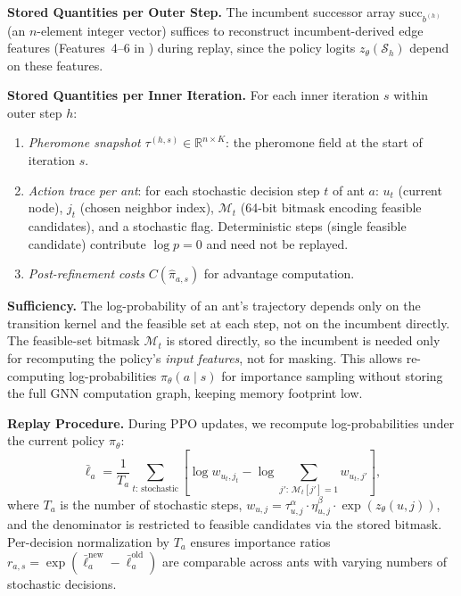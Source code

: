 \documentclass[sigconf]{acmart}
\begin{document}
\textbf{Stored Quantities per Outer Step.}
The incumbent successor array $\mathrm{succ}_{b^{(h)}}$ (an $n$-element integer vector) suffices to reconstruct incumbent-derived edge features (Features~4--6 in ) during replay, since the policy logits $z_\theta(\mathcal{S}_h)$ depend on these features.

\textbf{Stored Quantities per Inner Iteration.}
For each inner iteration $s$ within outer step $h$:
\begin{enumerate}
\item \emph{Pheromone snapshot} $\tau^{(h,s)} \in \mathbb{R}^{n \times K}$: the pheromone field at the start of iteration $s$.
\item \emph{Action trace per ant}: for each stochastic decision step $t$ of ant $a$:
  $u_t$ (current node), $j_t$ (chosen neighbor index), $\mathcal{M}_t$ (64-bit bitmask encoding feasible candidates), and a stochastic flag.
  Deterministic steps (single feasible candidate) contribute $\log p = 0$ and need not be replayed.
\item \emph{Post-refinement costs} $C(\hat{\pi}_{a,s})$ for advantage computation.
\end{enumerate}

\textbf{Sufficiency.}
The log-probability of an ant's trajectory depends only on the transition kernel and the feasible set at each step, not on the incumbent directly.
The feasible-set bitmask $\mathcal{M}_t$ is stored directly, so the incumbent is needed only for recomputing the policy's \emph{input features}, not for masking.
This allows re-computing log-probabilities $\pi_\theta(a \mid s)$ for importance sampling without storing the full GNN computation graph, keeping memory footprint low.

\textbf{Replay Procedure.}
During PPO updates, we recompute log-probabilities under the current policy $\pi_\theta$:
\begin{equation}
\bar{\ell}_a = \frac{1}{T_a}\sum_{t:\, \text{stochastic}} \!\left[ \log w_{u_t, j_t} - \log \!\sum_{j':\, \mathcal{M}_t[j']=1} w_{u_t, j'} \right],
\end{equation}
where $T_a$ is the number of stochastic steps, $w_{u,j} = \tau_{u,j}^\alpha \cdot \eta_{u,j}^\beta \cdot \exp(z_\theta(u,j))$, and the denominator is restricted to feasible candidates via the stored bitmask.
Per-decision normalization by $T_a$ ensures importance ratios $r_{a,s} = \exp(\bar{\ell}_a^{\text{new}} - \bar{\ell}_a^{\text{old}})$ are comparable across ants with varying numbers of stochastic decisions.
\end{document}
